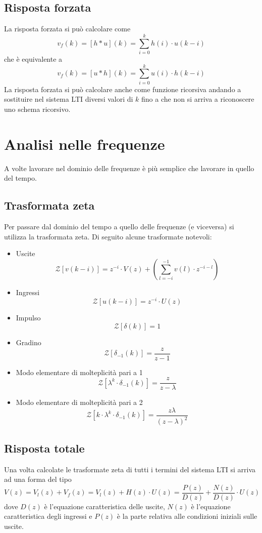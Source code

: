 \documentclass[a4paper,oneside,titlepage]{book}
\begin{document}
\subsection{Risposta forzata}
La risposta forzata si può calcolare come
\[ v_f(k) = [h*u](k) = \sum_{i=0}^k h(i) \cdot u(k-i) \]
che è equivalente a
\[ v_f(k) = [u*h](k) = \sum_{i=0}^k u(i) \cdot h(k-i) \]
La risposta forzata si può calcolare anche come funzione ricorsiva andando a sostituire nel sistema LTI diversi valori di $k$ fino a che non si arriva a riconoscere uno schema ricorsivo.


\section{Analisi nelle frequenze}
A volte lavorare nel dominio delle frequenze è più semplice che lavorare in quello del tempo.

\subsection{Trasformata zeta}
Per passare dal dominio del tempo a quello delle frequenze (e viceversa) si utilizza la trasformata zeta. Di seguito alcune trasformate notevoli:
\begin{itemize}
\item Uscite
\[ \mathcal{Z} \left[ v(k-i) \right] = z^{-i} \cdot V(z) + \left( \sum_{l=-i}^{-1} v(l) \cdot z^{-i-l} \right) \]

\item Ingressi
\[ \mathcal{Z} \left[ u(k-i) \right] = z^{-i} \cdot U(z) \]

\item Impulso
\[ \mathcal{Z} \left[ \delta(k) \right] = 1 \]

\item Gradino
\[ \mathcal{Z} \left[ \delta_{-1}(k) \right] = \frac{z}{z - 1} \]

\item Modo elementare di molteplicità pari a 1
\[ \mathcal{Z} \left[ \lambda^k \cdot \delta_{-1}(k) \right] = \frac{z}{z - \lambda} \]

\item Modo elementare di molteplicità pari a 2
\[ \mathcal{Z} \left[ k \cdot \lambda^k \cdot \delta_{-1}(k) \right] = \frac{z \lambda}{(z - \lambda)^2} \]
\end{itemize}

\subsection{Risposta totale}
Una volta calcolate le trasformate zeta di tutti i termini del sistema LTI si arriva ad una forma del tipo
\[ V(z) = V_l(z) + V_f(z) = V_l(z) + H(z) \cdot U(z) = \frac{P(z)}{D(z)} + \frac{N(z)}{D(z)} \cdot U(z) \]
dove $D(z)$ è l'equazione caratteristica delle uscite, $N(z)$ è l'equazione caratteristica degli ingressi e $P(z)$ è la parte relativa alle condizioni iniziali sulle uscite.
\end{document}
